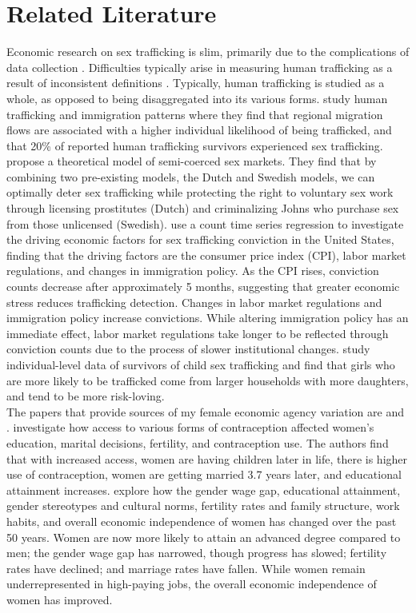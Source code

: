 \documentclass[10pt]{article}
\begin{document}
\section{Related Literature}
Economic research on sex trafficking is slim, primarily due to the complications of data collection \citep{Kristiina}. Difficulties typically arise in measuring human trafficking as a result of inconsistent definitions \citep{Hanson}. Typically, human trafficking is studied as a whole, as opposed to being disaggregated into its various forms. \cite{omar} study human trafficking and immigration patterns where they find that regional migration flows are associated with a higher individual likelihood of being trafficked, and that 20\% of reported human trafficking survivors experienced sex trafficking. \cite{leeandpersson} propose a theoretical model of semi-coerced sex markets. They find that by combining two pre-existing models, the Dutch and Swedish models, we can optimally deter sex trafficking while protecting the right to voluntary sex work through licensing prostitutes (Dutch) and criminalizing Johns who purchase sex from those unlicensed (Swedish). \cite{Jang} use a count time series regression to investigate the driving economic factors for sex trafficking conviction in the United States, finding that the driving factors are the consumer price index (CPI), labor market regulations, and changes in immigration policy. As the CPI rises, conviction counts decrease after approximately 5 months, suggesting that greater economic stress reduces trafficking detection. Changes in labor market regulations and immigration policy increase convictions. While altering immigration policy has an immediate effect, labor market regulations take longer to be reflected through conviction counts due to the process of slower institutional changes. \cite{Nyqviststiina} study individual-level data of survivors of child sex trafficking and find that girls who are more likely to be trafficked come from larger households with more daughters, and tend to be more risk-loving. \\
\indent The papers that provide sources of my female economic agency variation are \cite{baileyandlindo} and \cite{baileyanddiprete}. \cite{baileyandlindo} investigate how access to various forms of contraception affected women’s education, marital decisions, fertility, and contraception use. The authors find that with increased access, women are having children later in life, there is higher use of contraception, women are getting married 3.7 years later, and educational attainment increases. \cite{baileyanddiprete} explore how the gender wage gap, educational attainment, gender stereotypes and cultural norms, fertility rates and family structure, work habits, and overall economic independence of women has changed over the past 50 years. Women are now more likely to attain an advanced degree compared to men; the gender wage gap has narrowed, though progress has slowed; fertility rates have declined; and marriage rates have fallen. While women remain underrepresented in high-paying jobs, the overall economic independence of women has improved.
\end{document}
